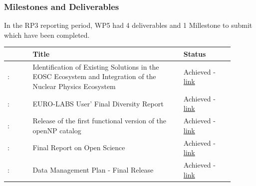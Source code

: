 \subsubsection*{Milestones and Deliverables}
In the RP3 reporting period, WP5 had 4 deliverables and 1 Millestone to submit which have been completed.

\begin{prtwo}
{\fontsize{9}{11}\selectfont
\begin{center}
  {\color{black}\begin{tabular}[t]{!{\color{mygray}\vrule}p{0.10\linewidth}!
  {\color{mygray}\vrule}p{0.60\linewidth}!
  {\color{mygray}\vrule}p{0.20\linewidth}!{\color{mygray}\vrule} } \hline
     & {\bf Title} & {\bf Status} \\ 

 \hline
    : & Identification of Existing Solutions in the EOSC Ecosystem and Integration of the Nuclear Physics Ecosystem  & Achieved - \href{https://web.infn.it/EURO-LABS/wp-content/uploads/2025/09/EURO-LABS_MS36-1.pdf}{link} \\ 
    \hline
    : & EURO-LABS User' Final Diversity Report & Achieved -  \href{ https://web.infn.it/EURO-LABS/wp-content/uploads/2026/03/EURO-LABS_D5.2-Report.pdf}{link} \\
    \hline
    : & Release of the first functional version of the openNP catalog & Achieved - \href{https://web.infn.it/EURO-LABS/wp-content/uploads/2026/03/EURO-LABS_D5.3-Report.pdf}{link} \\
    \hline
    : & Final Report on Open Science & Achieved - \href{https://web.infn.it/EURO-LABS/wp-content/uploads/2026/06/EURO-LABS-D5.6-Report.pdf}{link} \\
    \hline
    : & Data Management Plan - Final Release & Achieved - \href{https://web.infn.it/EURO-LABS/wp-content/uploads/2026/07/EURO-LABS_D5.9-DMP_Final-Release.pdf}{link} \\ 
    \hline
  \end{tabular}}
\end{center}
}
\end{prtwo}

